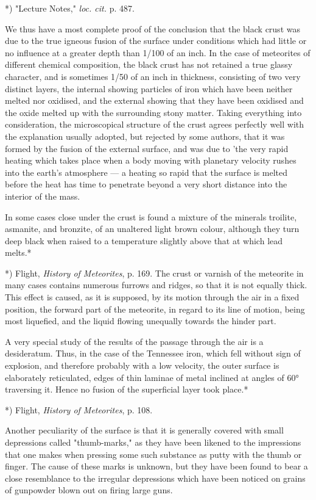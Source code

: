 \documentclass[a4paper, 12pt, oneside, polutonikogreek, english]{article}
\begin{document}
*) "Lecture Notes," \emph{loc. cit.} p. 487.

We thus have a most complete proof of the conclusion that the black crust was due to the true igneous fusion of the surface under conditions which had little or no influence at a greater depth than 1/100 of an inch. In the case of meteorites of different chemical composition, the black crust has not retained a true glassy character, and is sometimes 1/50 of an inch in thickness, consisting of two very distinct layers, the internal showing particles of iron which have been neither melted nor oxidised, and the external showing that they have been oxidised and the oxide melted up with the surrounding stony matter. Taking everything into consideration, the microscopical structure of the crust agrees perfectly well with the explanation usually adopted, but rejected by some authors, that it was formed by the fusion of the external surface, and was due to 'the very rapid heating which takes place when a body moving with planetary velocity rushes into the earth's atmosphere --- a heating so rapid that the surface is melted before the heat has time to penetrate beyond a very short distance into the interior of the mass.

In some cases close under the crust is found a mixture of the minerals troilite, asmanite, and bronzite, of an unaltered light brown colour, although they turn deep black when raised to a temperature slightly above that at which lead melts.*

*) Flight, \emph{History of Meteorites}, p. 169.
 The crust or varnish of the meteorite in many cases contains numerous furrows and ridges, so that it is not equally thick. This effect is caused, as it is supposed, by its motion through the air in a fixed position, the forward part of the meteorite, in regard to its line of motion, being most liquefied, and the liquid flowing unequally towards the hinder part.

A very special study of the results of the passage through the air is a desideratum. Thus, in the case of the Tennessee iron, which fell without sign of explosion, and therefore probably with a low velocity, the outer surface is elaborately reticulated, edges of thin laminae of metal inclined at angles of 60° traversing it. Hence no fusion of the superficial layer took place.*

*) Flight, \emph{History of Meteorites}, p. 108.

Another peculiarity of the surface is that it is generally covered with small depressions called "thumb-marks," as they have been likened to the impressions that one makes when pressing some such substance as putty with the thumb or finger. The cause of these marks is unknown, but they have been found to bear a close resemblance to the irregular depressions which have been noticed on grains of gunpowder blown out on firing large guns.
\end{document}

